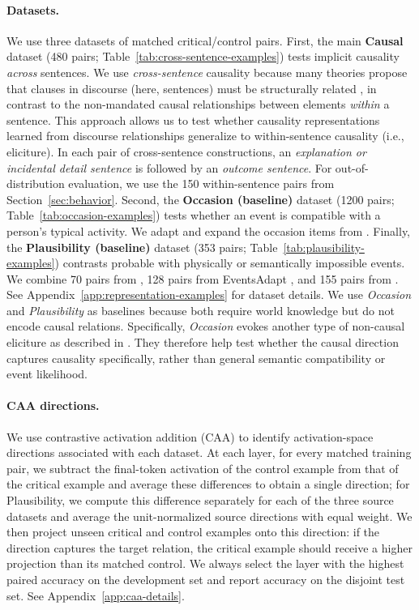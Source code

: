 \documentclass{article}
\begin{document}
\paragraph{Datasets.} We use three datasets of matched critical/control pairs.
First, the main \textbf{Causal} dataset (480 pairs; Table~\ref{tab:cross-sentence-examples}) tests implicit causality \emph{across} sentences. We use \emph{cross-sentence} causality because many theories propose that clauses in discourse (here, sentences) must be structurally related \citep[e.g.,][]{hobbs_literature_1990,kehler_coherence_2002}, in contrast to the non-mandated causal relationships between elements \emph{within} a sentence. This approach allows us to test whether causality representations learned from discourse relationships generalize to within-sentence causality (i.e., eliciture). In each pair of cross-sentence constructions, an \emph{explanation or incidental detail sentence} is followed by an \emph{outcome sentence}.
For out-of-distribution evaluation, we use the 150 within-sentence pairs from Section~\ref{sec:behavior}.
Second, the \textbf{Occasion (baseline)} dataset (1200 pairs; Table~\ref{tab:occasion-examples}) tests whether an event is compatible with a person's typical activity. We adapt and expand the occasion items from \citet{hu-rubiofernandez-2026-referential}.
Finally, the \textbf{Plausibility (baseline)} dataset (353 pairs; Table~\ref{tab:plausibility-examples}) contrasts probable with physically or semantically impossible events. We combine 70 pairs from \citet{hu-etal-2025-shades}, 128 pairs from EventsAdapt \citep{kauf-etal-2023-event}, and 155 pairs from \citet{vega-mendoza-etal-2021-concurrent}. See Appendix~\ref{app:representation-examples} for dataset details.
We use \emph{Occasion} and \emph{Plausibility} as baselines because both require world knowledge but do not encode causal relations. Specifically, \emph{Occasion} evokes another type of non-causal eliciture as described in \citet{hu-rubiofernandez-2026-referential}. They therefore help test whether the causal direction captures causality specifically, rather than general semantic compatibility or event likelihood.

\paragraph{CAA directions.} We use contrastive activation addition (CAA) \citep{rimsky-etal-2024-steering} to identify activation-space directions associated with each dataset. At each layer, for every matched training pair, we subtract the final-token activation of the control example from that of the critical example and average these differences to obtain a single direction; for Plausibility, we compute this difference separately for each of the three source datasets and average the unit-normalized source directions with equal weight. We then project unseen critical and control examples onto this direction: if the direction captures the target relation, the critical example should receive a higher projection than its matched control. We always select the layer with the highest paired accuracy on the development set and report accuracy on the disjoint test set. See Appendix~\ref{app:caa-details}.
\end{document}
